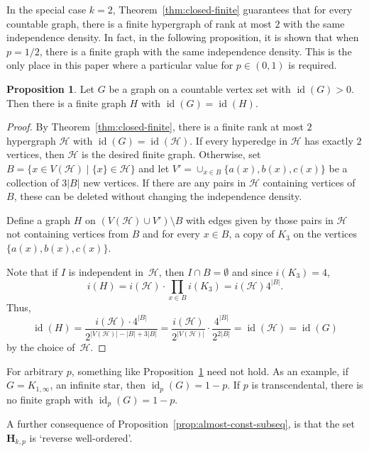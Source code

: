 \documentclass[11pt,reqno]{amsart}
\theoremstyle{definition}
\newtheorem{proposition}[theorem]{Proposition}
\begin{document}
In the special case $k = 2$, Theorem~\ref{thm:closed-finite} guarantees that for every countable graph, there is a finite hypergraph of rank at most $2$ with the same independence density.  In fact, in the following proposition, it is shown that when $p = 1/2$, there is a finite graph with the same independence density.  This is the only place in this paper where a particular value for $p \in (0,1)$ is required.

\begin{proposition}\label{prop:graphs}
Let $G$ be a graph on a countable vertex set with ${\operatorname{id}}(G) > 0$. Then there is a finite graph $H$ with ${\operatorname{id}}(G) = {\operatorname{id}}(H)$.
\end{proposition}
\begin{proof}
By Theorem~\ref{thm:closed-finite}, there is a finite rank at most $2$ hypergraph $\mathcal{H}$ with ${\operatorname{id}}(G) = {\operatorname{id}}(\mathcal{H})$. If every hyperedge in $\mathcal{H}$ has exactly $2$ vertices, then $\mathcal{H}$ is the desired finite graph. Otherwise, set $B = \{x \in V(\mathcal{H}) \mid \{x \} \in \mathcal{H}\}$ and let $V' = \cup_{x \in B}\{a(x), b(x), c(x)\}$ be a collection of $3|B|$ new vertices. If there are any pairs in $\mathcal{H}$ containing vertices of~$B$, these can be deleted without changing the independence density.

Define a graph $H$ on $(V(\mathcal{H}) \cup V') \setminus B$ with edges given by those pairs in $\mathcal{H}$ not containing vertices from $B$ and for every $x \in B$, a copy of $K_3$ on the vertices $\{a(x), b(x), c(x)\}$.

Note that if $I$ is independent in~$\mathcal{H}$, then $I \cap B = \emptyset$ and since $i(K_3) = 4$,
\[
 i(H) = i(\mathcal{H}) \cdot \prod_{x \in B} i(K_3) = i(\mathcal{H}) 4^{|B|}.
\]
Thus,
\[
 {\operatorname{id}}(H) = \frac{i(\mathcal{H} )\cdot 4^{|B|}}{2^{|V(\mathcal{H})| - |B| + 3|B|}} = \frac{i(\mathcal{H})}{2^{|V(\mathcal{H})|}} \cdot \frac{4^{|B|}}{2^{2|B|}} = {\operatorname{id}}(\mathcal{H}) = {\operatorname{id}}(G)
\]
by the choice of~$\mathcal{H}$.
\end{proof}

For arbitrary $p$, something like Proposition~\ref{prop:graphs} need not hold.  As an example, if $G = K_{1, \infty}$, an infinite star, then ${\operatorname{id}}_p(G) = 1-p$.  If $p$ is transcendental, there is no finite graph with ${\operatorname{id}}_p(G) = 1-p$.

A further consequence of Proposition~\ref{prop:almost-const-subseq}, is that the set $\mathbf{H}_{k,p}$ is `reverse well-ordered'.
\end{document}
